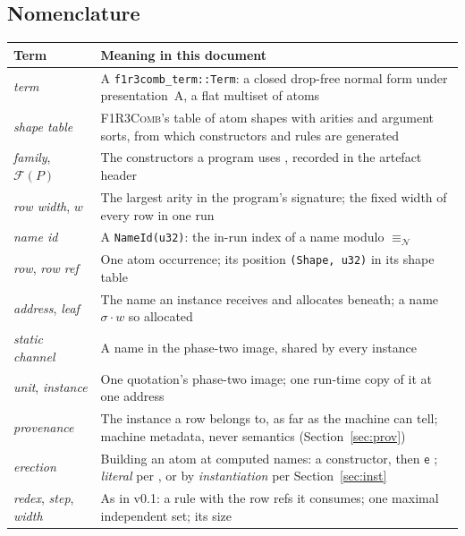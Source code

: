 \documentclass[11pt,a4paper]{article}
\newcommand{\code}[1]{\texttt{#1}}
\newcommand{\Comb}{\textsc{F1R3Comb}}
\newcommand{\nequiv}{\equiv_{\mathcal{N}}}
\newcommand{\ev}{\mathsf{e}}
\theoremstyle{definition}
\theoremstyle{plain}
\newcommand{\Fam}{\mathcal{F}}
\begin{document}
\subsection{Nomenclature}\label{sec:nomen}

\begin{center}
\begin{tabularx}{\linewidth}{@{}l>{\raggedright\arraybackslash}X@{}}
\toprule
Term & Meaning in this document\\
\midrule
\emph{term} & A \code{f1r3comb\_term::Term}: a closed drop-free normal form
under presentation~A, a flat multiset of atoms \cite[Req.~4.3]{combspec}\\
\emph{shape table} & \Comb's table of atom shapes with arities and argument
sorts, from which constructors and rules are generated
\cite[Req.~4.5]{combspec}\\
\emph{family}, $\Fam(P)$ & The constructors a program uses
\cite[Req.~4.7]{combspec}, recorded in the artefact header\\
\emph{row width}, $w$ & The largest arity in the program's signature; the
fixed width of every row in one run\\
\emph{name id} & A \code{NameId(u32)}: the in-run index of a name modulo
$\nequiv$\\
\emph{row}, \emph{row ref} & One atom occurrence; its position
\code{(Shape, u32)} in its shape table\\
\emph{address}, \emph{leaf} & The name an instance receives and allocates
beneath; a name $\sigma\!\cdot\!w$ so allocated \cite[Def.~6.6]{draft3}\\
\emph{static channel} & A name in the phase-two image, shared by every
instance \cite[\S1.3]{combspec}\\
\emph{unit}, \emph{instance} & One quotation's phase-two image; one
run-time copy of it at one address\\
\emph{provenance} & The instance a row belongs to, as far as the machine can
tell; machine metadata, never semantics (Section~\ref{sec:prov})\\
\emph{erection} & Building an atom at computed names: a constructor, then
$\ev$ \cite[Rem.~3.11]{draft3}; \emph{literal} per \cite[Def.~6.8]{draft3},
or by \emph{instantiation} per Section~\ref{sec:inst}\\
\emph{redex}, \emph{step}, \emph{width} & As in v0.1: a rule with the row refs
it consumes; one maximal independent set; its size\\
\bottomrule
\end{tabularx}
\end{center}
\end{document}
